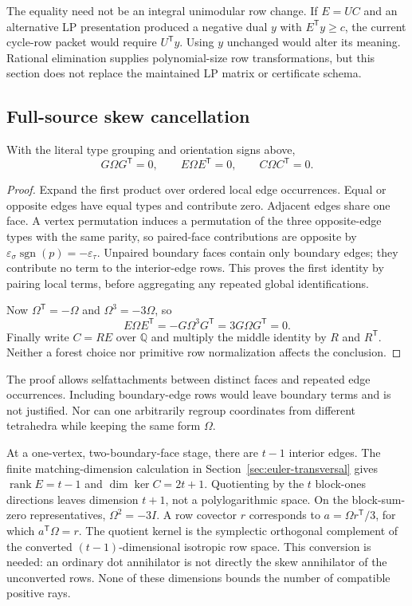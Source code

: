 The equality need not be an integral unimodular row change.  If $E=UC$ and
an alternative LP presentation produced a negative dual $y$ with
$E^{\mathsf T}y\ge c$, the current cycle-row packet would require
$U^{\mathsf T}y$.  Using $y$ unchanged would alter its meaning.  Rational
elimination supplies polynomial-size row transformations, but this section
does not replace the maintained LP matrix or certificate schema.

\subsection{Full-source skew cancellation}

\begin{proposition}
With the literal type grouping and orientation signs above,
\[
 G\Omega G^{\mathsf T}=0,\qquad
 E\Omega E^{\mathsf T}=0,\qquad
 C\Omega C^{\mathsf T}=0.
\]
\end{proposition}
\begin{proof}
Expand the first product over ordered local edge occurrences.  Equal or
opposite edges have equal types and contribute zero.  Adjacent edges share
one face.  A vertex permutation induces a permutation of the three
opposite-edge types with the same parity, so paired-face contributions are
opposite by
$\varepsilon_\sigma\operatorname{sgn}(p)=-\varepsilon_\tau$.
Unpaired boundary faces contain only boundary edges; they contribute no
term to the interior-edge rows.  This proves the first identity by pairing
local terms, before aggregating any repeated global identifications.

Now $\Omega^{\mathsf T}=-\Omega$ and $\Omega^3=-3\Omega$, so
\[
 E\Omega E^{\mathsf T}
   =-G\Omega^3G^{\mathsf T}=3G\Omega G^{\mathsf T}=0.
\]
Finally write $C=RE$ over $\mathbb Q$ and multiply the middle identity by
$R$ and $R^{\mathsf T}$.  Neither a forest choice nor primitive row
normalization affects the conclusion.
\end{proof}

The proof allows selfattachments between distinct faces and repeated edge
occurrences.  Including boundary-edge rows would leave boundary terms and
is not justified.  Nor can one arbitrarily regroup coordinates from
different tetrahedra while keeping the same form $\Omega$.

At a one-vertex, two-boundary-face stage, there are $t-1$ interior edges.
The finite matching-dimension calculation in
Section~\ref{sec:euler-transversal} gives $\operatorname{rank}E=t-1$ and
$\dim\ker C=2t+1$.  Quotienting by the $t$ block-ones directions leaves
dimension $t+1$, not a polylogarithmic space.  On the block-sum-zero
representatives, $\Omega^2=-3I$.  A row covector $r$ corresponds to
$a=\Omega r^{\mathsf T}/3$, for which $a^{\mathsf T}\Omega=r$.
The quotient kernel is the symplectic orthogonal complement of the
converted $(t-1)$-dimensional isotropic row space.  This conversion is
needed: an ordinary dot annihilator is not directly the skew annihilator
of the unconverted rows.  None of these dimensions bounds the number of
compatible positive rays.

